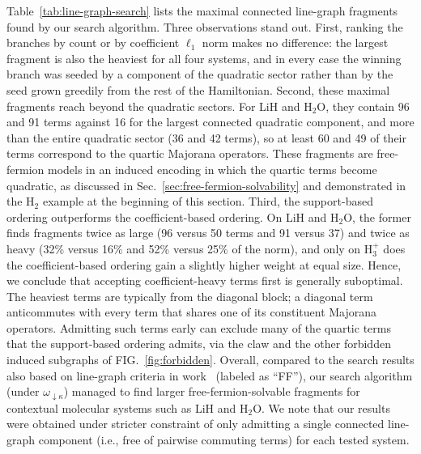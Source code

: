 \documentclass[%
 aip,
 amsmath,amssymb,
 reprint,%
]{revtex4-1}
\newcommand{\skey}{\kappa}               %
\newcommand{\ordk}{\omega_{\downarrow\skey}} %
\begin{document}
Table~\ref{tab:line-graph-search} lists the maximal connected line-graph fragments found by our search algorithm. Three observations stand out. First, ranking the branches by count or by coefficient $\ell_1$ norm makes no difference: the largest fragment is also the heaviest for all four systems, and in every case the winning branch was seeded by a component of the quadratic sector rather than by the seed grown greedily from the rest of the Hamiltonian. Second, these maximal fragments reach beyond the quadratic sectors. For LiH and H$_2$O, they contain 96 and 91 terms against 16 for the largest connected quadratic component, and more than the entire quadratic sector (36 and 42 terms), so at least 60 and 49 of their terms correspond to the quartic Majorana operators. These fragments are free-fermion models in an induced encoding in which the quartic terms become quadratic, as discussed in Sec.~\ref{sec:free-fermion-solvability} and demonstrated in the H$_2$ example at the beginning of this section. Third, the support-based ordering outperforms the coefficient-based ordering. On LiH and H$_2$O, the former finds fragments twice as large (96 versus 50 terms and 91 versus 37) and twice as heavy (32\% versus 16\% and 52\% versus 25\% of the norm), and only on H$_3^+$ does the coefficient-based ordering gain a slightly higher weight at equal size. Hence, we conclude that accepting coefficient-heavy terms first is generally suboptimal. The heaviest terms are typically from the diagonal block; a diagonal term anticommutes with every term that shares one of its constituent Majorana operators. Admitting such terms early can exclude many of the quartic terms that the support-based ordering admits, via the claw and the other forbidden induced subgraphs of FIG.~\ref{fig:forbidden}. Overall, compared to the search results also based on line-graph criteria in work~\cite{patel2024exactly} (labeled as ``FF''), our search algorithm (under $\ordk$) managed to find larger free-fermion-solvable fragments for contextual molecular systems such as LiH and H$_2$O. We note that our results were obtained under stricter constraint of only admitting a single connected line-graph component (i.e., free of pairwise commuting terms) for each tested system. 
\end{document}
